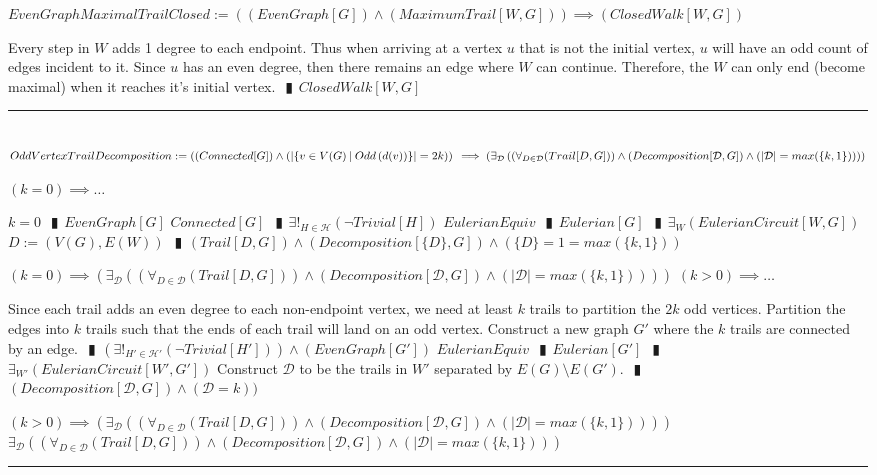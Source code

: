 \documentclass{book}
\newcommand{\abr}{:=}
\newcommand{\pipe}{$\phantom{(}\vrectangleblack\phantom{)}$}
\newcommand{\pr}[1]{\left(#1\right)}
\newcommand{\st}{\mathbin{|}}
\begin{document}
$EvenGraphMaximalTrailClosed \abr \pr{(EvenGraph[G]) \land (MaximumTrail[W, G])} \implies (ClosedWalk[W, G])$
\begin{enumerate}
  \lit Every step in $W$ adds 1 degree to each endpoint.
  \lit Thus when arriving at a vertex $u$ that is not the initial vertex, $u$ will have an odd count of edges incident to it.
  \lit Since $u$ has an even degree, then there remains an edge where $W$ can continue.
  \lit Therefore, the $W$ can only end (become maximal) when it reaches it's initial vertex. \pipe $ClosedWalk[W, G]$
\end{enumerate} \vspace{.75mm} \hrule \vspace{.75mm} \ \\ 

$OddVertexTrailDecomposition \abr \pr{(Connected[G]) \land \pr{|\{v \in V(G) \st Odd\pr{d(v)}\}| = 2 k}} \\
                                  \implies \pr{\exists_{\mathcal{D}}\pr{\pr{\forall_{D \in \mathcal{D}}(Trail[D, G])} \land (Decomposition[\mathcal{D}, G]) \land \pr{|\mathcal{D}| = max(\{k, 1\})}}}$
\begin{enumerate}
  \lit $(k = 0) \implies \ldots$
  \begin{enumerate}
    \lit $k = 0$ \pipe $EvenGraph[G]$
    \lit $Connected[G]$ \pipe $\exists!_{H \in \mathcal{H}}(\lnot Trivial[H])$
    \lit $EulerianEquiv$ \pipe $Eulerian[G]$ \pipe $\exists_{W}(EulerianCircuit[W, G])$
    \lit $D \abr \pr{V(G), E(W)}$ \pipe $(Trail[D, G]) \land (Decomposition[\{D\}, G]) \land \pr{\{D\} = 1 = max(\{k, 1\})}$
  \end{enumerate}
  \lit $(k = 0) \implies \pr{\exists_{\mathcal{D}}\pr{\pr{\forall_{D \in \mathcal{D}}(Trail[D, G])} \land (Decomposition[\mathcal{D}, G]) \land \pr{|\mathcal{D}| = max(\{k, 1\})}}}$
  \lit $(k > 0) \implies \ldots$
  \begin{enumerate}
    \lit Since each trail adds an even degree to each non-endpoint vertex, we need at least $k$ trails to partition the $2 k$ odd vertices.
    \lit Partition the edges into $k$ trails such that the ends of each trail will land on an odd vertex.
    \lit Construct a new graph $G'$ where the $k$ trails are connected by an edge. \pipe $\pr{\exists!_{H' \in \mathcal{H}'}(\lnot Trivial[H'])} \land (EvenGraph[G'])$
    \lit $EulerianEquiv$ \pipe $Eulerian[G']$ \pipe $\exists_{W'}(EulerianCircuit[W', G'])$
    \lit Construct $\mathcal{D}$ to be the trails in $W'$ separated by $E(G) \setminus E(G')$. \pipe $(Decomposition[\mathcal{D}, G]) \land (\mathcal{D} = k))$
  \end{enumerate}
  \lit $(k > 0) \implies \pr{\exists_{\mathcal{D}}\pr{\pr{\forall_{D \in \mathcal{D}}(Trail[D, G])} \land (Decomposition[\mathcal{D}, G]) \land \pr{|\mathcal{D}| = max(\{k, 1\})}}}$
  \lit $\exists_{\mathcal{D}}\pr{\pr{\forall_{D \in \mathcal{D}}(Trail[D, G])} \land (Decomposition[\mathcal{D}, G]) \land \pr{|\mathcal{D}| = max(\{k, 1\})}}$
\end{enumerate} \vspace{.75mm} \hrule \vspace{.75mm} \ \\ 
\end{document}
